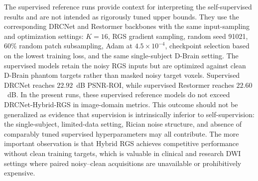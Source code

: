 \documentclass[preprint,12pt]{elsarticle}
\begin{document}
The supervised reference runs provide context for interpreting the self-supervised results and are not intended as rigorously tuned upper bounds. They use the corresponding DRCNet and Restormer backbones with the same input-sampling and optimization settings: $K=16$, RGS gradient sampling, random seed 91021, $60\%$ random patch subsampling, Adam at $4.5\times10^{-4}$, checkpoint selection based on the lowest training loss, and the same single-subject D-Brain setting. The supervised models retain the noisy RGS inputs but are optimized against clean D-Brain phantom targets rather than masked noisy target voxels. Supervised DRCNet reaches $22.92$~dB PSNR-ROI, while supervised Restormer reaches $22.60$~dB. In the present runs, these supervised reference models do not exceed DRCNet-Hybrid-RGS in image-domain metrics. This outcome should not be generalized as evidence that supervision is intrinsically inferior to self-supervision: the single-subject, limited-data setting, Rician noise structure, and absence of comparably tuned supervised hyperparameters may all contribute. The more important observation is that Hybrid RGS achieves competitive performance without clean training targets, which is valuable in clinical and research DWI settings where paired noisy--clean acquisitions are unavailable or prohibitively expensive.
\end{document}
